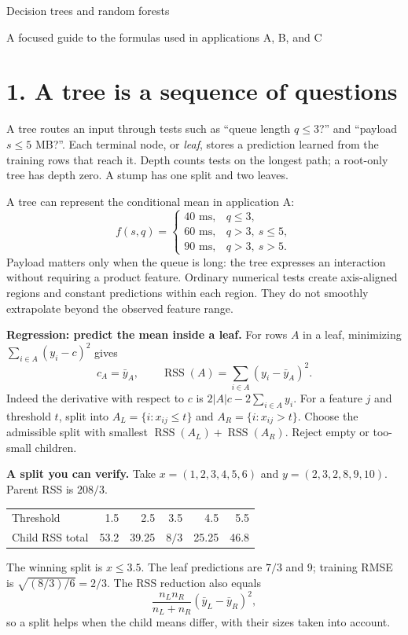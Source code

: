 \documentclass[11pt,a4paper]{article}
\begin{document}
{\LARGE\color{navy}Decision trees and random forests}\par
{\large A focused guide to the formulas used in applications A, B, and C}

\section*{1. A tree is a sequence of questions}
A tree routes an input through tests such as ``queue length $q\le3$?'' and
``payload $s\le5$ MB?''. Each terminal node, or \emph{leaf}, stores a prediction
learned from the training rows that reach it. Depth counts tests on the longest
path; a root-only tree has depth zero. A stump has one split and two leaves.

A tree can represent the conditional mean in application A:
\[
f(s,q)=\begin{cases}
40\text{ ms},&q\le3,\\
60\text{ ms},&q>3,\ s\le5,\\
90\text{ ms},&q>3,\ s>5.
\end{cases}
\]
Payload matters only when the queue is long: the tree expresses an interaction
without requiring a product feature. Ordinary numerical tests create axis-aligned
regions and constant predictions within each region. They do not smoothly
extrapolate beyond the observed feature range.

\textbf{Regression: predict the mean inside a leaf.}
For rows $A$ in a leaf, minimizing $\sum_{i\in A}(y_i-c)^2$ gives
\[
\boxed{c_A=\bar y_A,\qquad
\operatorname{RSS}(A)=\sum_{i\in A}(y_i-\bar y_A)^2.}
\]
Indeed the derivative with respect to $c$ is $2|A|c-2\sum_{i\in A}y_i$.
For a feature $j$ and threshold $t$, split into $A_L=\{i:x_{ij}\le t\}$
and $A_R=\{i:x_{ij}>t\}$. Choose the admissible split with smallest
$\operatorname{RSS}(A_L)+\operatorname{RSS}(A_R)$. Reject empty or too-small children.

\textbf{A split you can verify.} Take $x=(1,2,3,4,5,6)$ and
$y=(2,3,2,8,9,10)$. Parent RSS is $208/3$.
\begin{center}
\begin{tabular}{@{}lrrrrr@{}}\toprule
Threshold & 1.5 & 2.5 & 3.5 & 4.5 & 5.5\\
Child RSS total & 53.2 & 39.25 & $8/3$ & 25.25 & 46.8\\\bottomrule
\end{tabular}
\end{center}
The winning split is $x\le3.5$. The leaf predictions are $7/3$ and 9;
training RMSE is $\sqrt{(8/3)/6}=2/3$. The RSS reduction also equals
\[
\boxed{\frac{n_Ln_R}{n_L+n_R}(\bar y_L-\bar y_R)^2,}
\]
so a split helps when the child means differ, with their sizes taken into account.
\end{document}
